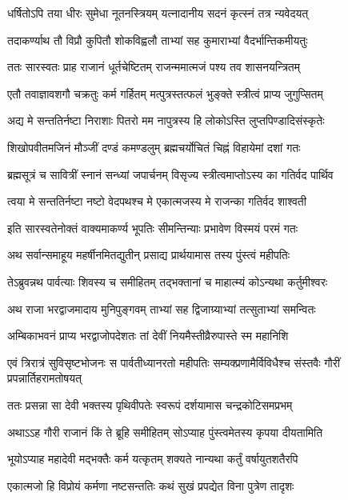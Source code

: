 \twolineshloka
{धर्षितोऽपि तया धीरः सुमेधा नूतनस्त्रियम्}
{यत्नादानीय सदनं कृत्स्नं तत्र न्यवेदयत्} %

\twolineshloka
{तदाकर्ण्याथ तौ विप्रौ कुपितौ शोकविह्वलौ}
{ताभ्यां सह कुमाराभ्यां वैदर्भान्तिकमीयतुः} %

\twolineshloka
{ततः सारस्वतः प्राह राजानं धूर्तचेष्टितम्}
{राजन्ममात्मजं पश्य तव शासनयन्त्रितम्} %

\twolineshloka
{एतौ तवाज्ञावशगौ चक्रतुः कर्म गर्हितम्}
{मत्पुत्रस्तत्फलं भुङ्क्ते स्त्रीत्वं प्राप्य जुगुप्सितम्} %

\twolineshloka
{अद्य मे सन्ततिर्नष्टा निराशाः पितरो मम}
{नापुत्रस्य हि लोकोऽस्ति लुप्तपिण्डादिसंस्कृतेः} %

\twolineshloka
{शिखोपवीतमजिनं मौञ्जीं दण्डं कमण्डलुम्}
{ब्रह्मचर्योचितं चिह्नं विहायेमां दशां गतः} %

\twolineshloka
{ब्रह्मसूत्रं च सावित्रीं स्नानं सन्ध्यां जपार्चनम्}
{विसृज्य स्त्रीत्वमाप्तोऽस्य का गतिर्वद पार्थिव} %

\twolineshloka
{त्वया मे सन्ततिर्नष्टा नष्टो वेदपथश्च मे}
{एकात्मजस्य मे राजन्का गतिर्वद शाश्वती} %

\twolineshloka
{इति सारस्वतेनोक्तं वाक्यमाकर्ण्य भूपतिः}
{सीमन्तिन्याः प्रभावेण विस्मयं परमं गतः} %

\twolineshloka
{अथ सर्वान्समाहूय महर्षीनमितद्युतीन्}
{प्रसाद्य प्रार्थयामास तस्य पुंस्त्वं महीपतिः} %

\twolineshloka
{तेऽब्रुवन्नथ पार्वत्याः शिवस्य च समीहितम्}
{तद्भक्तानां च माहात्म्यं कोऽन्यथा कर्तुमीश्वरः} %

\twolineshloka
{अथ राजा भरद्वाजमादाय मुनिपुङ्गवम्}
{ताभ्यां सह द्विजाग्र्याभ्यां तत्सुताभ्यां समन्वितः} %

\twolineshloka
{अम्बिकाभवनं प्राप्य भरद्वाजोपदेशतः}
{तां देवीं नियमैस्तीव्रैरुपास्ते स्म महानिशि} %

\fourlineindentedshloka
{एवं त्रिरात्रं सुविसृष्टभोजनः}
{स पार्वतीध्यानरतो महीपतिः}
{सम्यक्प्रणामैर्विविधैश्च संस्तवैः}
{गौरीं प्रपन्नार्तिहरामतोषयत्} %

\twolineshloka
{ततः प्रसन्ना सा देवी भक्तस्य पृथिवीपतेः}
{स्वरूपं दर्शयामास चन्द्रकोटिसमप्रभम्} %

\twolineshloka
{अथाऽऽह गौरी राजानं किं ते ब्रूहि समीहितम्}
{सोऽप्याह पुंस्त्वमेतस्य कृपया दीयतामिति} %

\twolineshloka
{भूयोऽप्याह महादेवी मद्भक्तैः कर्म यत्कृतम्}
{शक्यते नान्यथा कर्तुं वर्षायुतशतैरपि} %

\twolineshloka
{एकात्मजो हि विप्रोयं कर्मणा नष्टसन्ततिः}
{कथं सुखं प्रपद्येत विना पुत्रेण तादृशः} %

